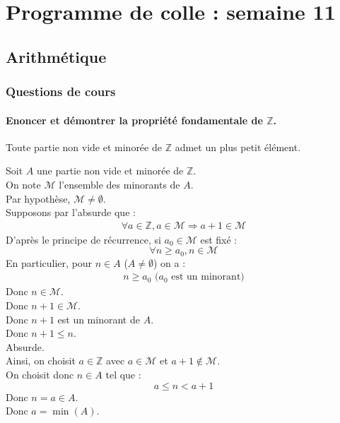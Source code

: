 \documentclass[titlepage, twoside]{report}
\makeatletter
\renewcommand{\tableofcontents}{%
  \@starttoc{toc}
}
\makeatother
\begin{document}
\chapter*{Programme de colle : semaine 11}
\tableofcontents

\section{Arithmétique}
\subsection{Questions de cours}
\subsubsection{Enoncer et démontrer la propriété fondamentale de $\mathbb{Z}$. }
\begin{tcolorbox}[title=Théorème 12.1, title filled=false, colframe=orange, colback=orange!10!white]
    Toute partie non vide et minorée de $\mathbb{Z}$ admet un plus petit élément. 
\end{tcolorbox}

\noindent Soit $A$ une partie non vide et minorée de $\mathbb{Z}$. \\
On note $\mathcal{M}$ l'ensemble des minorants de $A$. \\
Par hypothèse, $\mathcal{M} \neq \emptyset$. \\
Supposons par l'absurde que : 
\begin{align*}
    \forall a \in \mathbb{Z}, a \in \mathcal{M} \Rightarrow a + 1 \in \mathcal{M}
\end{align*}
D'après le principe de récurrence, si $a_0 \in \mathcal{M}$ est fixé : 
$$\forall n \geq a_0, n \in \mathcal{M}$$
En particulier, pour $n \in A$ ($A \neq \emptyset$) on a : 
\begin{align*}
    n \geq a_0 \text{ ($a_0$ est un minorant)}
\end{align*}
Donc $n \in \mathcal{M}$. \\
Donc $n + 1 \in \mathcal{M}$. \\
Donc $n + 1$ est un minorant de $A$. \\
Donc $n + 1 \leq n$. \\
Absurde. \\
Ainsi, on choisit $a \in \mathbb{Z}$ avec $a \in \mathcal{M}$ et $a + 1 \not \in \mathcal{M}$. \\
On choisit donc $n \in A$ tel que : 
$$a \leq n < a + 1$$
Donc $n = a \in A$. \\
Donc $a = \min(A)$.
\end{document}
